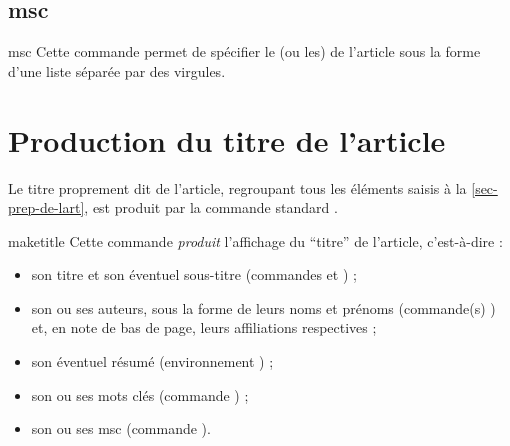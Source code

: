 \documentclass[french,nolocaltoc]{nwejmart}
\newtheorem[title=Fait,style=definition]{fact}
\begin{document}
\subsection{\texorpdfstring{\acrfull{msc}}{MSC}}

\begin{docCommand}[doc description=\mandatory]{msc}{}
  Cette commande permet de spécifier le (ou les)  de
  l'article sous la forme d'une liste séparée par des virgules.
\end{docCommand}

\section{Production du titre de l'article}
\label{sec-creation-du-titre}

Le titre proprement dit de l'article, regroupant tous les éléments saisis à la
\vref{sec-prep-de-lart}, est produit par la commande standard
.

\begin{docCommand}[doc description=\mandatory]{maketitle}{}
  Cette commande \emph{produit} l'affichage du \enquote{titre} de l'article,
  c'est-à-dire :
  \begin{itemize}
  \item son titre et son éventuel sous-titre (commandes  et
    ) ;
  \item son ou ses auteurs, sous la forme de leurs noms et prénoms (commande(s)
    ) et, en note de bas de page, leurs affiliations respectives ;
  \item son éventuel résumé (environnement ) ;
  \item son ou ses mots clés (commande ) ;
  \item son ou ses \acrshort{msc} (commande ).
  \end{itemize}
\end{docCommand}
\end{document}
